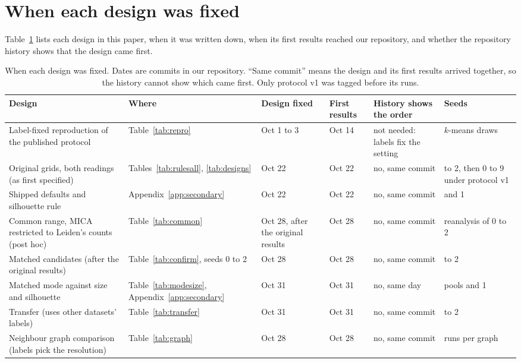 \section{When each design was fixed}\label{app:provenance}
Table~\ref{tab:provenance} lists each design in this paper, when it was written down, when its first results
reached our repository, and whether the repository history shows that the design came first.
\begin{table}[t]
\centering
\caption{When each design was fixed. Dates are commits in our repository. ``Same commit'' means the design
and its first results arrived together, so the history cannot show which came first. Only protocol v1 was
tagged before its runs.}
\label{tab:provenance}
\footnotesize
\setlength{\tabcolsep}{3pt}
\begin{tabular}{>{\raggedright\arraybackslash}p{3.3cm}>{\raggedright\arraybackslash}p{2.9cm}>{\raggedright\arraybackslash}p{2.5cm}>{\raggedright\arraybackslash}p{1.6cm}>{\raggedright\arraybackslash}p{3.3cm}>{\raggedright\arraybackslash}p{2.6cm}}
\toprule
Design & Where & Design fixed & First results & History shows the order & Seeds \\
\midrule
Label-fixed reproduction of the published protocol & Table~\ref{tab:repro} & Oct 1 to 3 & Oct 14 & not needed: labels fix the setting & 3 $k$-means draws \\
Original grids, both readings (as first specified) & Tables~\ref{tab:rulesall}, \ref{tab:designs} & Oct 22 & Oct 22 & no, same commit & 0 to 2, then 0 to 9 under protocol v1 \\
Shipped defaults and silhouette rule & Appendix~\ref{app:secondary} & Oct 22 & Oct 22 & no, same commit & 3 and 1 \\
Common range, MICA restricted to Leiden's counts (post hoc) & Table~\ref{tab:common} & Oct 28, after the original results & Oct 28 & no, same commit & reanalysis of 0 to 2 \\
Matched candidates (after the original results) & Table~\ref{tab:confirm}, seeds 0 to 2 & Oct 28 & Oct 28 & no, same commit & 0 to 2 \\
Matched mode against size and silhouette & Table~\ref{tab:modesize}, Appendix~\ref{app:secondary} & Oct 31 & Oct 31 & no, same day & 3 pools and 1 \\
Transfer (uses other datasets' labels) & Table~\ref{tab:transfer} & Oct 31 & Oct 31 & no, same commit & 0 to 2 \\
Neighbour graph comparison (labels pick the resolution) & Table~\ref{tab:graph} & Oct 28 & Oct 28 & no, same commit & 2 runs per graph \\

\end{tabular}
\end{table}
